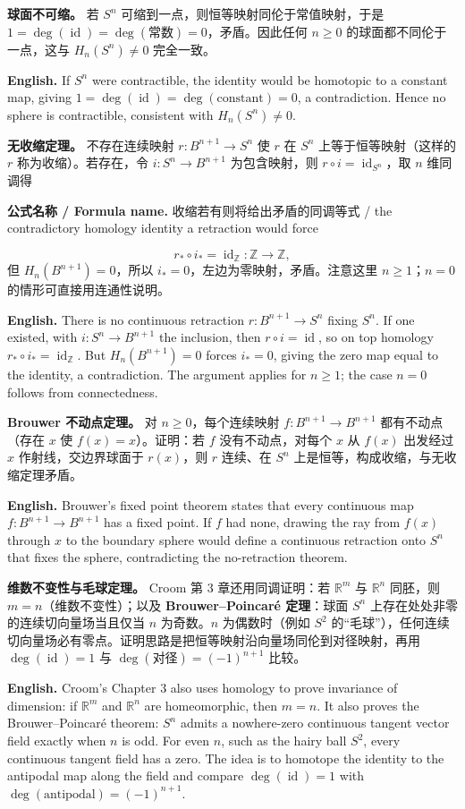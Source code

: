 \documentclass[UTF8,11pt,a4paper]{ctexart}
\newcommand{\EN}[1]{\par\noindent\textbf{English.} #1\par}
\newcommand{\FORMULA}[2]{\par\noindent\textbf{公式名称 / Formula name.} #1 / #2\par}
\begin{document}
\noindent\textbf{球面不可缩。} 若 $S^n$ 可缩到一点，则恒等映射同伦于常值映射，于是 $1=\deg(\operatorname{id})=\deg(\text{常数})=0$，矛盾。因此任何 $n\ge0$ 的球面都不同伦于一点，这与 $H_n(S^n)\ne0$ 完全一致。
\EN{If $S^n$ were contractible, the identity would be homotopic to a constant map, giving $1=\deg(\operatorname{id})=\deg(\text{constant})=0$, a contradiction. Hence no sphere is contractible, consistent with $H_n(S^n)\ne0$.}

\noindent\textbf{无收缩定理。} 不存在连续映射 $r:B^{n+1}\to S^n$ 使 $r$ 在 $S^n$ 上等于恒等映射（这样的 $r$ 称为收缩）。若存在，令 $i:S^n\to B^{n+1}$ 为包含映射，则 $r\circ i=\operatorname{id}_{S^n}$，取 $n$ 维同调得
\FORMULA{收缩若有则将给出矛盾的同调等式}{the contradictory homology identity a retraction would force}
\[
r_*\circ i_*=\operatorname{id}_{\mathbb Z}:\mathbb Z\to\mathbb Z,
\]
但 $H_n(B^{n+1})=0$，所以 $i_*=0$，左边为零映射，矛盾。注意这里 $n\ge1$；$n=0$ 的情形可直接用连通性说明。
\EN{There is no continuous retraction $r:B^{n+1}\to S^n$ fixing $S^n$. If one existed, with $i:S^n\to B^{n+1}$ the inclusion, then $r\circ i=\operatorname{id}$, so on top homology $r_*\circ i_*=\operatorname{id}_{\mathbb Z}$. But $H_n(B^{n+1})=0$ forces $i_*=0$, giving the zero map equal to the identity, a contradiction. The argument applies for $n\ge1$; the case $n=0$ follows from connectedness.}

\noindent\textbf{Brouwer 不动点定理。} 对 $n\ge0$，每个连续映射 $f:B^{n+1}\to B^{n+1}$ 都有不动点（存在 $x$ 使 $f(x)=x$）。证明：若 $f$ 没有不动点，对每个 $x$ 从 $f(x)$ 出发经过 $x$ 作射线，交边界球面于 $r(x)$，则 $r$ 连续、在 $S^n$ 上是恒等，构成收缩，与无收缩定理矛盾。
\EN{Brouwer's fixed point theorem states that every continuous map $f:B^{n+1}\to B^{n+1}$ has a fixed point. If $f$ had none, drawing the ray from $f(x)$ through $x$ to the boundary sphere would define a continuous retraction onto $S^n$ that fixes the sphere, contradicting the no-retraction theorem.}

\noindent\textbf{维数不变性与毛球定理。} Croom 第 3 章还用同调证明：若 $\mathbb R^m$ 与 $\mathbb R^n$ 同胚，则 $m=n$（维数不变性）；以及 \textbf{Brouwer--Poincaré 定理}：球面 $S^n$ 上存在处处非零的连续切向量场当且仅当 $n$ 为奇数。$n$ 为偶数时（例如 $S^2$ 的“毛球”），任何连续切向量场必有零点。证明思路是把恒等映射沿向量场同伦到对径映射，再用 $\deg(\operatorname{id})=1$ 与 $\deg(\text{对径})=(-1)^{n+1}$ 比较。
\EN{Croom's Chapter 3 also uses homology to prove invariance of dimension: if $\mathbb R^m$ and $\mathbb R^n$ are homeomorphic, then $m=n$. It also proves the Brouwer--Poincaré theorem: $S^n$ admits a nowhere-zero continuous tangent vector field exactly when $n$ is odd. For even $n$, such as the hairy ball $S^2$, every continuous tangent field has a zero. The idea is to homotope the identity to the antipodal map along the field and compare $\deg(\operatorname{id})=1$ with $\deg(\text{antipodal})=(-1)^{n+1}$.}
\end{document}
